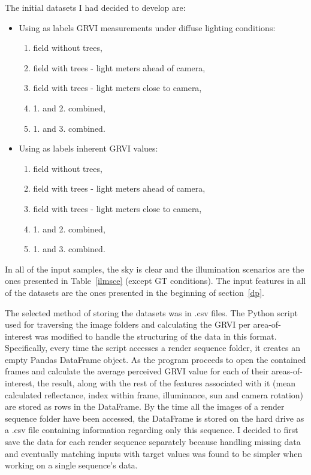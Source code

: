 The initial datasets I had decided to develop are:
\begin{itemize}
    \item Using as labels GRVI measurements under diffuse lighting conditions:
    \begin{enumerate}
        \item field without trees,
        \item field with trees - light meters ahead of camera,
        \item field with trees - light meters close to camera,
        \item 1. and 2. combined,
        \item 1. and 3. combined.
    \end{enumerate}
    \item Using as labels inherent GRVI values:
        \begin{enumerate}
        \item field without trees,
        \item field with trees - light meters ahead of camera,
        \item field with trees - light meters close to camera,
        \item 1. and 2. combined,
        \item 1. and 3. combined.
    \end{enumerate}
\end{itemize}

In all of the input samples, the sky is clear and the illumination scenarios are the ones presented in Table~\ref{ilmsce} (except GT conditions). The input features in all of the datasets are the ones presented in the beginning of section~\ref{dp}.

The selected method of storing the datasets was in .csv files. The Python script used for traversing the image folders and calculating the GRVI per area-of-interest was modified to handle the structuring of the data in this format. Specifically, every time the script accesses a render sequence folder, it creates an empty Pandas DataFrame object. As the program proceeds to open the contained frames and calculate the average perceived GRVI value for each of their areas-of-interest, the result, along with the rest of the features associated with it (mean calculated reflectance, index within frame, illuminance, sun and camera rotation) are stored as rows in the DataFrame. By the time all the images of a render sequence folder have been accessed, the DataFrame is stored on the hard drive as a .csv file containing information regarding only this sequence. I decided to first save the data for each render sequence separately because handling missing data and eventually matching inputs with target values was found to be simpler when working on a single sequence's data.

